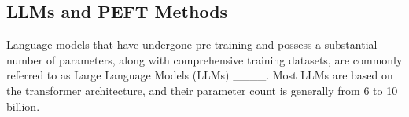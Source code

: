 
\subsection{LLMs and PEFT Methods}
Language models that have undergone pre-training and possess a substantial number of parameters, along with comprehensive training datasets, are commonly referred to as Large Language Models (LLMs) ____. Most LLMs are based on the transformer architecture, and their parameter count is generally from 6 to 10 billion. %


